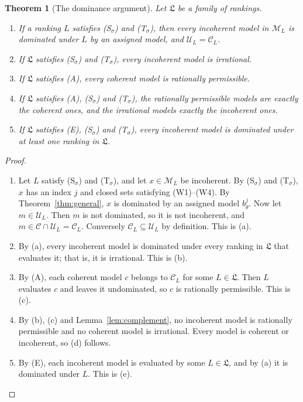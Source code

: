 \documentclass[11pt]{article}
\newtheorem{theorem}{Theorem}[section]
\theoremstyle{definition}
\theoremstyle{remark}
\newcommand{\M}{\mathcal M}
\newcommand{\C}{\mathcal C}
\newcommand{\U}{\mathcal U}
\newcommand{\Lf}{\mathfrak L}
\begin{document}
\begin{theorem}[The dominance argument]\label{thm:argument}
Let $\Lf$ be a family of rankings.
\begin{enumerate}[label=(\alph*)]
\item If a ranking $L$ satisfies (S$_\sigma$) and (T$_\sigma$), then every incoherent model in $\M_L$ is dominated under $L$ by an assigned model, and $\U_L=\C_L$.
\item If $\Lf$ satisfies (S$_\sigma$) and (T$_\sigma$), every incoherent model is irrational.
\item If $\Lf$ satisfies (A), every coherent model is rationally permissible.
\item If $\Lf$ satisfies (A), (S$_\sigma$) and (T$_\sigma$), the rationally permissible models are exactly the coherent ones, and the irrational models exactly the incoherent ones.
\item If $\Lf$ satisfies (E), (S$_\sigma$) and (T$_\sigma$), every incoherent model is dominated under at least one ranking in $\Lf$.
\end{enumerate}
\end{theorem}
\begin{proof}
\leavevmode
\begin{enumerate}[label=\arabic*.,leftmargin=*]
\item Let $L$ satisfy (S$_\sigma$) and (T$_\sigma$), and let $x\in\M_L$ be incoherent. By (S$_\sigma$) and (T$_\sigma$), $x$ has an index $j$ and closed sets satisfying (W1)--(W4). By Theorem~\ref{thm:general}, $x$ is dominated by an assigned model $b^j_\theta$. Now let $m\in\U_L$. Then $m$ is not dominated, so it is not incoherent, and $m\in\C\cap\U_L=\C_L$. Conversely $\C_L\subseteq\U_L$ by definition. This is (a).
\item By (a), every incoherent model is dominated under every ranking in $\Lf$ that evaluates it; that is, it is irrational. This is (b).
\item By (A), each coherent model $c$ belongs to $\C_L$ for some $L\in\Lf$. Then $L$ evaluates $c$ and leaves it undominated, so $c$ is rationally permissible. This is (c).
\item By (b), (c) and Lemma~\ref{lem:complement}, no incoherent model is rationally permissible and no coherent model is irrational. Every model is coherent or incoherent, so (d) follows.
\item By (E), each incoherent model is evaluated by some $L\in\Lf$, and by (a) it is dominated under $L$. This is (e).\qedhere
\end{enumerate}
\end{proof}
\end{document}
